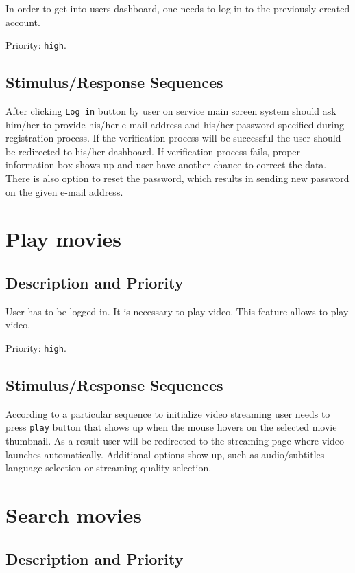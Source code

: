 \documentclass{scrreprt}
\begin{document}
In order to get into users dashboard, one needs to log in to the previously created account.

Priority: \verb|high|.

\subsection{Stimulus/Response Sequences}

After clicking \verb|Log in| button by user on service main screen system should ask him/her to provide his/her e-mail address and his/her password specified during registration process. If the verification process will be successful the user should be redirected to his/her dashboard. If verification process fails, proper information box shows up and user have another chance to correct the data. There is also option to reset the password, which results in sending new password on the given e-mail address.

\section{Play movies}

\subsection{Description and Priority}

User has to be logged in. It is necessary to play video. This feature allows to play video.

Priority: \verb|high|.

\subsection{Stimulus/Response Sequences}

According to a particular sequence to initialize video streaming user needs to press \verb|play| button that shows up when the mouse hovers on the selected movie thumbnail. As a result user will be redirected to the streaming page where video launches automatically. Additional options show up, such as audio/subtitles language selection or streaming quality selection.

\section{Search movies}

\subsection{Description and Priority}
\end{document}
